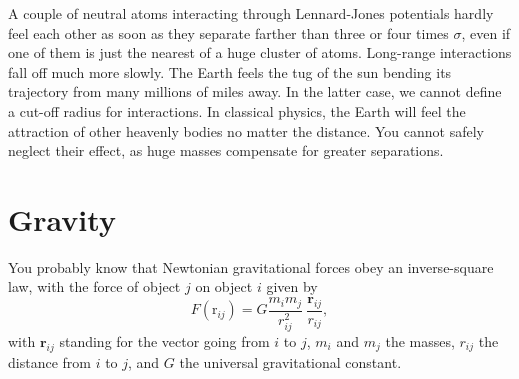 A couple of neutral atoms interacting through Lennard-Jones potentials hardly 
feel each other as soon as they separate farther than three or four times 
$\sigma$, even if one of them is just the nearest of a huge cluster of atoms. 
Long-range interactions fall off much more slowly. The Earth feels the tug of 
the sun bending its trajectory from many millions of miles away. In the latter 
case, we cannot define a cut-off radius for interactions. In classical physics, 
the Earth will feel the attraction of other heavenly bodies no matter the 
distance. You cannot safely neglect their effect, as huge masses compensate for 
greater separations.

\section{Gravity}

You probably know that Newtonian gravitational forces obey an inverse-square
law, with the force of object $j$ on object $i$ given by
\begin{equation*}
  F(\mathrm{r}_{ij}) = G \frac{m_i m_j}{r_{ij}^2}\
                         \frac{\mathbf{r}_{ij}}{r_{ij}},
\end{equation*}
with $\mathbf{r}_{ij}$ standing for the vector going from $i$ to $j$, $m_i$ and
$m_j$ the masses, $r_{ij}$ the distance from $i$ to $j$, and $G$ the universal
gravitational constant.


